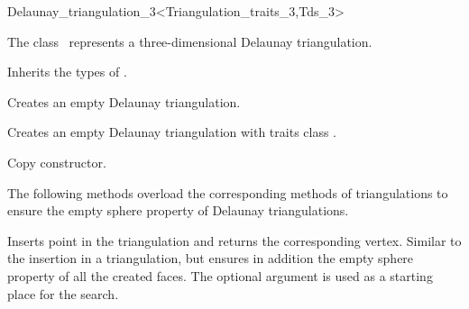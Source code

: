 

\begin{ccRefClass}{Delaunay_triangulation_3<Triangulation_traits_3,Tds_3>}  %


\ccDefinition
  
The class \ccRefName\ represents a three-dimensional Delaunay triangulation.



\ccTypes

Inherits the types of .

\ccCreation
{}  %



{Creates an empty Delaunay triangulation.}

{Creates an empty Delaunay triangulation with traits class
.}

{Copy constructor.}

\ccOperations


The following methods overload the corresponding methods of
triangulations to ensure the empty sphere property of Delaunay 
triangulations.

{Inserts point  in the triangulation and returns the corresponding
 vertex. Similar to the insertion in a triangulation, but ensures in
addition the empty sphere property of all the created faces.
The optional argument  is used as a starting place for the search.}


\end{ccRefClass}
